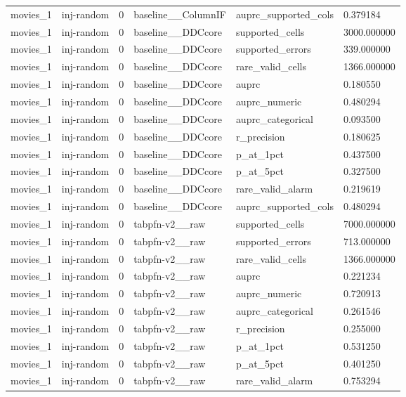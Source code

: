 \begin{tabular}{llllll}
movies\_1 & inj-random & 0 & baseline\_\_ColumnIF & auprc\_supported\_cols & 0.379184 \\
movies\_1 & inj-random & 0 & baseline\_\_DDCcore & supported\_cells & 3000.000000 \\
movies\_1 & inj-random & 0 & baseline\_\_DDCcore & supported\_errors & 339.000000 \\
movies\_1 & inj-random & 0 & baseline\_\_DDCcore & rare\_valid\_cells & 1366.000000 \\
movies\_1 & inj-random & 0 & baseline\_\_DDCcore & auprc & 0.180550 \\
movies\_1 & inj-random & 0 & baseline\_\_DDCcore & auprc\_numeric & 0.480294 \\
movies\_1 & inj-random & 0 & baseline\_\_DDCcore & auprc\_categorical & 0.093500 \\
movies\_1 & inj-random & 0 & baseline\_\_DDCcore & r\_precision & 0.180625 \\
movies\_1 & inj-random & 0 & baseline\_\_DDCcore & p\_at\_1pct & 0.437500 \\
movies\_1 & inj-random & 0 & baseline\_\_DDCcore & p\_at\_5pct & 0.327500 \\
movies\_1 & inj-random & 0 & baseline\_\_DDCcore & rare\_valid\_alarm & 0.219619 \\
movies\_1 & inj-random & 0 & baseline\_\_DDCcore & auprc\_supported\_cols & 0.480294 \\
movies\_1 & inj-random & 0 & tabpfn-v2\_\_raw & supported\_cells & 7000.000000 \\
movies\_1 & inj-random & 0 & tabpfn-v2\_\_raw & supported\_errors & 713.000000 \\
movies\_1 & inj-random & 0 & tabpfn-v2\_\_raw & rare\_valid\_cells & 1366.000000 \\
movies\_1 & inj-random & 0 & tabpfn-v2\_\_raw & auprc & 0.221234 \\
movies\_1 & inj-random & 0 & tabpfn-v2\_\_raw & auprc\_numeric & 0.720913 \\
movies\_1 & inj-random & 0 & tabpfn-v2\_\_raw & auprc\_categorical & 0.261546 \\
movies\_1 & inj-random & 0 & tabpfn-v2\_\_raw & r\_precision & 0.255000 \\
movies\_1 & inj-random & 0 & tabpfn-v2\_\_raw & p\_at\_1pct & 0.531250 \\
movies\_1 & inj-random & 0 & tabpfn-v2\_\_raw & p\_at\_5pct & 0.401250 \\
movies\_1 & inj-random & 0 & tabpfn-v2\_\_raw & rare\_valid\_alarm & 0.753294 \\

\end{tabular}
